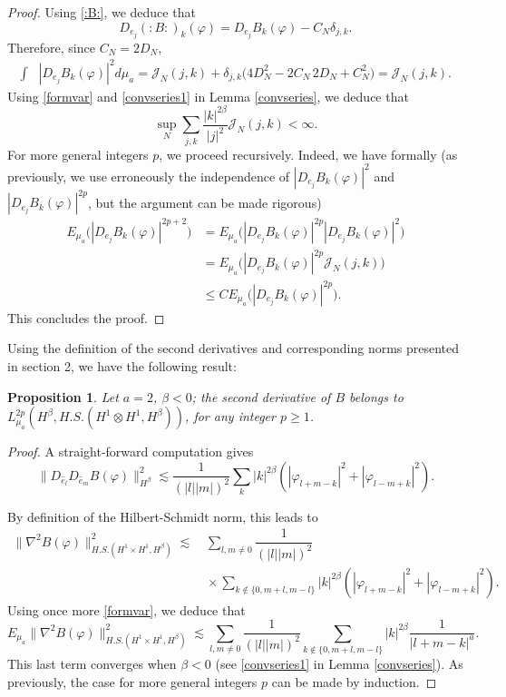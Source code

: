 \documentclass[11pt,leqno]{amsart}
\newtheorem{prop}{Proposition}[section]
\begin{document}
\begin{proof}
Using \eqref{:B:}, we deduce that 
$$D_{e_j} (:B :)_k (\varphi) = D_{e_j} B_k (\varphi) - C_N \delta_{j,k} .$$
Therefore, since $C_N=2 D_N$, 
\begin{align*}
\int & |D_{e_j}B_k(\varphi)|^2 d\mu_a =   {\mathcal J}_N(j,k) + \delta_{j,k}\big( 4 D_N^2 - 2C_N \, 2D_N + C_N^2\big)  = {\mathcal J}_N(j,k) . 
\end{align*}
Using \eqref{formvar} and \eqref{convseries1} in Lemma \ref{convseries}, we deduce that
$$\sup_N \sum_{j,k} \frac{|k|^{2\beta}}{|j|^2} {\mathcal J}_N(j,k) <\infty.$$
For more general integers $p$, we proceed recursively. Indeed, we have formally (as previously, we use erroneously the independence
 of $ |D_{e_j}B_k(\varphi)|^2$ and $|D_{e_j}B_k(\varphi)|^{2p}$, but the argument can be made rigorous)  
\begin{align*}
E_{\mu_a}\big(  |D_{e_j}B_k(\varphi)|^{2p+2}\big) 
&=  E_{\mu_a} \big( |D_{e_j}B_k(\varphi)|^{2p} |D_{e_j}B_k(\varphi)|^2 \big)\\
&=  E_{\mu_a} \big( |D_{e_j}B_k(\varphi)|^{2p}  {\mathcal J}_N(j,k)  \big)\\
&\leq C   E_{\mu_a} \big( |D_{e_j}B_k(\varphi) |^{2p} \big).
\end{align*}
This concludes the proof.
\end{proof}

Using the definition of the second derivatives and corresponding norms presented in section 2, we have the following result: 





\begin{prop}
Let $a=2$, $\beta<0$; the second derivative of $B$ belongs to $L^{2p}_{\mu_a} (H^\beta , H.S. (H^1 \otimes H^1 , H^\beta))$, for any integer $p\geq 1$.


\end{prop}

\begin{proof}
A straight-forward computation gives
$$\| D_{\hat{e}_l}D_{\hat{e}_m} B (\varphi) \|^2_{H^\beta}\lesssim \dfrac{1}{(|l||m|)^{2}} \sum_k |k|^{2\beta}  (|\varphi_{l+m-k}|^2 + |\varphi_{l-m+k}|^2 ) . $$




By definition of the Hilbert-Schmidt norm, this leads to
\begin{align*}
 \|\nabla^2 B(\varphi) \|_{H.S.(H^1 \times H^1 , H^\beta)}^2 \lesssim &\, \sum_{ l,m\neq 0}  \dfrac{1}{(|l||m|)^{2}}  \\
&\, \times \sum_{ k\not\in \{ 0, m+l,m-l\}  }
 |k|^{2\beta} ( |\varphi_{l+m-k}|^2 + |\varphi_{l-m+k}|^2 ) . 
 \end{align*}
Using once more \eqref{formvar}, we deduce that
$$E_{\mu_a} \|\nabla^2 B(\varphi) \|_{H.S.(H^1 \times H^1 , H^\beta)}^2 \lesssim  \sum_{ l,m\neq 0}  \dfrac{1}{(|l||m|)^{2}} \sum_{ k\not\in \{ 0, m+l,m-l\}  }
 |k|^{2\beta}  \dfrac{1}{|l+m-k|^a}.  $$
This last term converges when $\beta <0 $ (see \eqref{convseries1} in  Lemma \ref{convseries}). As previously, the case for more general integers $p$ can be made by induction.
\end{proof}
\end{document}
